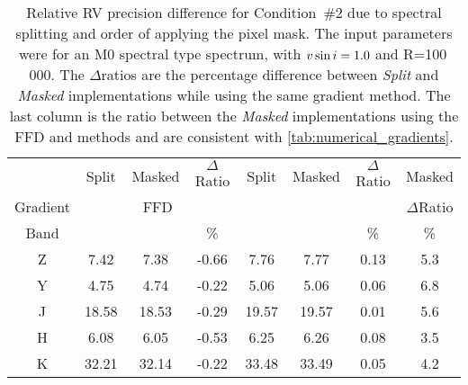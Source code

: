 
\begin{table}
    \centering
    \caption[{RV} precision with different splitting.]{Relative {RV} precision difference for Condition~\#2 due to spectral splitting and order of applying the pixel mask.
        The input parameters were for an {M0} spectral type spectrum, with $v\sin{i}=1.0$ and R=100\,000.
        The \(\Delta\)ratios are the percentage difference between \textit{Split} and \textit{Masked} implementations while using the same gradient method.
        The last column is the ratio between the \textit{Masked} implementations using the {FFD} and \npgradient{} methods and are consistent with \cref{tab:numerical_gradients}.
        }
    \begin{tabular}{c|ccc|ccc|c}
        \toprule
        & Split & Masked & \(\Delta\)Ratio & Split & Masked & \(\Delta\)Ratio & Masked \\
        Gradient & \multicolumn{3}{c|}{FFD} & \multicolumn{3}{c|}{\numpy{}} & \(\Delta\)Ratio\\
        Band & \mps{} & \mps{} &  \%  & \mps{} & \mps{} &   \% & \% \\
        \midrule
        Z &  7.42 &  7.38 & -0.66 &  7.76 &  7.77 & 0.13 & 5.3\\
        Y &  4.75 &  4.74 & -0.22 &  5.06 &  5.06 & 0.06 & 6.8\\
        J & 18.58 & 18.53 & -0.29 & 19.57 & 19.57 & 0.01 & 5.6\\
        H &  6.08 &  6.05 & -0.53 &  6.25 &  6.26 & 0.08 & 3.5\\
        K & 32.21 & 32.14 & -0.22 & 33.48 & 33.49 & 0.05 & 4.2\\
        \bottomrule
    \end{tabular}\label{tab:mask_ordering}
\end{table}

